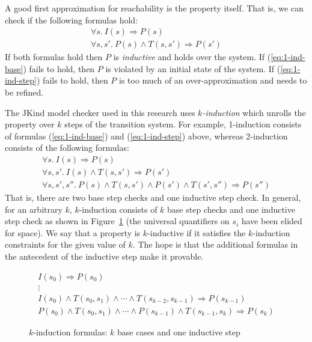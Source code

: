 A good first approximation for reachability is the property itself.
That is, we can check if the following formulas hold:
\begin{gather}
  \forall s.~ I(s) \Rightarrow P(s)
  \label{eq:1-ind-base} \\
  \forall s, s'.~ P(s) \land T(s, s') \Rightarrow P(s')
  \label{eq:1-ind-step}
\end{gather}
If both formulas hold then $P$ is {\em inductive} and holds over the
system. If (\ref{eq:1-ind-base}) fails to hold, then $P$ is violated
by an initial state of the system. If (\ref{eq:1-ind-step}) fails to
hold, then $P$ is too much of an over-approximation and needs to be
refined.

The JKind model checker used in this research uses {\em
  $k$-induction} which unrolls the property over $k$ steps of the
transition system. For example, 1-induction consists of formulas
(\ref{eq:1-ind-base}) and (\ref{eq:1-ind-step}) above, whereas
2-induction consists of the following formulas:
\begin{gather*}
\forall s.~ I(s) \Rightarrow P(s) \\
\forall s, s'.~ I(s) \land T(s, s') \Rightarrow P(s') \\
\forall s, s', s''.~ P(s) \land T(s, s') \land P(s') \land T(s',
  s'') \Rightarrow P(s'')
\end{gather*}
That is, there are two base step checks and one inductive step check.
In general, for an arbitrary $k$, $k$-induction consists of $k$
base step checks and one inductive step check as shown in
Figure~\ref{fig:k-induction} (the universal quantifiers on $s_i$ have
been elided for space). We say that a property is $k$-inductive if it
satisfies the $k$-induction constraints for the given value of $k$.
The hope is that the additional formulas in the antecedent of the
inductive step make it provable.

\begin{figure}
\begin{gather*}
I(s_0) \Rightarrow P(s_0) \\[-2pt]
%
\vdots \\[2pt]
%
I(s_0) \land T(s_0, s_1) \land \cdots \land T(s_{k-2}, s_{k-1})
\Rightarrow P(s_{k-1}) \\[2pt]
%
P(s_0) \land T(s_0, s_1) \land \cdots \land P(s_{k-1}) \land
T(s_{k-1}, s_k) \Rightarrow P(s_k)
\end{gather*}
\caption{$k$-induction formulas: $k$ base cases and one inductive
  step}
\label{fig:k-induction}
\end{figure}

